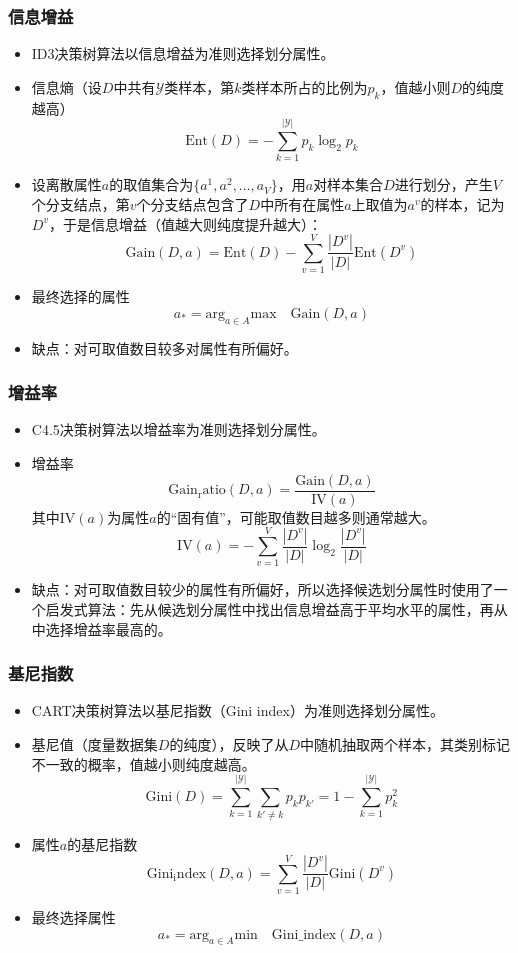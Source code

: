 \documentclass{ctexart}
\begin{document}
					\subsubsection{信息增益}
						\begin{itemize}
							\item ID3决策树算法以信息增益为准则选择划分属性。
							\item 信息熵（设$D$中共有$\mathcal{Y}$类样本，第$k$类样本所占的比例为$p_k$，值越小则$D$的纯度越高）\[\mathrm{Ent}(D)=-\sum_{k=1}^{|\mathcal{Y}|}p_k\log_2p_k\]
							\item 设离散属性$a$的取值集合为$\{a^1,a^2,\dots,a_V\}$，用$a$对样本集合$D$进行划分，产生$V$个分支结点，第$v$个分支结点包含了$D$中所有在属性$a$上取值为$a^v$的样本，记为$D^v$，于是信息增益（值越大则纯度提升越大）：\[\mathrm{Gain}(D,a)=\mathrm{Ent}(D)-\sum_{v=1}^{V}\frac{|D^v|}{|D|}\mathrm{Ent}(D^v)\]
							\item 最终选择的属性\[a_*=\mathrm{arg}_{a\in A}\mathrm{max}\quad\mathrm{Gain}(D,a)\]
							\item 缺点：对可取值数目较多对属性有所偏好。
						\end{itemize}
					\subsubsection{增益率}
						\begin{itemize}
							\item C4.5决策树算法以增益率为准则选择划分属性。
							\item 增益率\[\mathrm{Gain_ratio}(D,a)=\frac{\mathrm{Gain}(D,a)}{\mathrm{IV}(a)}\]其中$\mathrm{IV}(a)$为属性$a$的``固有值''，可能取值数目越多则通常越大。\[\mathrm{IV}(a)=-\sum_{v=1}^{V}\frac{|D^v|}{|D|}\log_2\frac{|D^v|}{|D|}\]
							\item 缺点：对可取值数目较少的属性有所偏好，所以选择候选划分属性时使用了一个启发式算法：先从候选划分属性中找出信息增益高于平均水平的属性，再从中选择增益率最高的。
						\end{itemize}
					\subsubsection{基尼指数}
						\begin{itemize}
							\item CART决策树算法以基尼指数（Gini index）为准则选择划分属性。
							\item 基尼值（度量数据集$D$的纯度），反映了从$D$中随机抽取两个样本，其类别标记不一致的概率，值越小则纯度越高。\[\mathrm{Gini}(D)=\sum_{k=1}^{|\mathcal{Y}|}\sum_{k'\neq k}^{}p_kp_{k'}=1-\sum_{k=1}^{|\mathcal{Y}|}p_k^2\]
							\item 属性$a$的基尼指数\[\mathrm{Gini_index}(D,a)=\sum_{v=1}^{V}\frac{|D^v|}{|D|}\mathrm{Gini}(D^v)\]
							\item 最终选择属性\[a_*=\mathrm{arg}_{a\in A}\mathrm{min}\quad\mathrm{Gini\_index}(D,a)\]
						\end{itemize}
\end{document}
